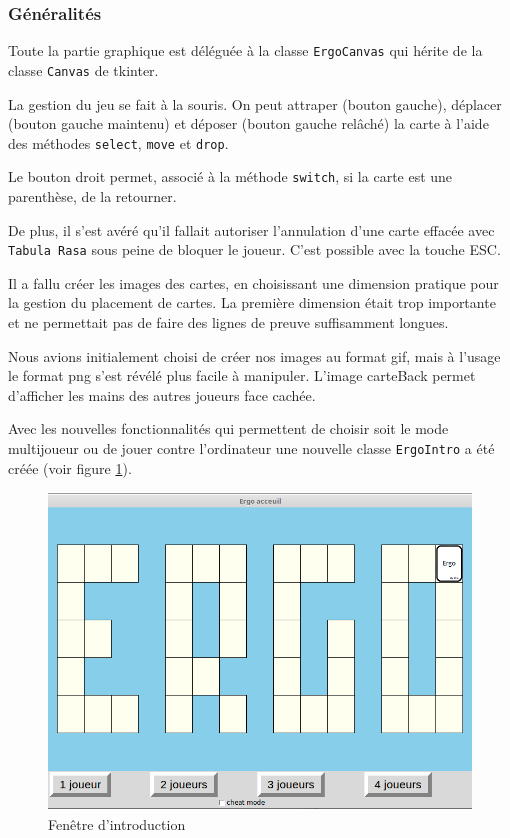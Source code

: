 \documentclass[12pt, a4paper]{article}
\begin{document}
\subsubsection{Généralités}

Toute la partie graphique est déléguée à la classe \texttt{ErgoCanvas} qui hérite de la classe \texttt{Canvas} de tkinter. 

La gestion du jeu se fait à la souris. On peut attraper (bouton gauche), déplacer (bouton gauche maintenu) et déposer (bouton gauche relâché) la carte à l'aide des méthodes \texttt{select}, \texttt{move} et \texttt{drop}.

Le bouton droit permet, associé à la méthode \texttt{switch}, si la carte est une parenthèse, de la retourner.

De plus, il s'est avéré qu'il fallait autoriser l'annulation d'une carte effacée avec \texttt{Tabula Rasa} sous peine de bloquer le joueur. C'est possible avec la touche ESC.

Il a fallu créer les images des cartes, en choisissant une dimension pratique pour la gestion du placement de cartes. La première dimension était trop importante et ne permettait pas de faire des lignes de preuve suffisamment longues.

Nous avions initialement choisi de créer nos images au format gif, mais à l'usage le format png s'est révélé plus facile à manipuler. L'image carteBack permet d'afficher les mains des autres joueurs face cachée.

Avec les nouvelles fonctionnalités qui permettent de choisir soit le mode multijoueur ou de jouer contre l'ordinateur une nouvelle classe \texttt{ErgoIntro} a été créée (voir figure \ref{ergoIntro}).

\begin{figure}
\begin{center}
\includegraphics[scale=0.35]{../images/ima1.png}
\end{center}
\caption{Fenêtre d'introduction}
\label{ergoIntro}
\end{figure} 
\end{document}
